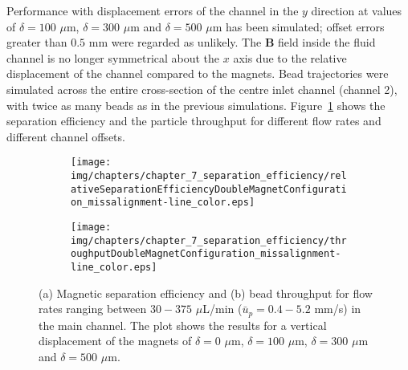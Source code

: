 Performance with displacement errors of the channel in the $y$ direction at values of $\delta=100$ $\mu$m, $\delta=300$ $\mu$m and $\delta=500$ $\mu$m has been simulated; offset errors greater than $0.5$ mm were regarded as unlikely. The $\mathbf{B}$ field inside the fluid channel is no longer symmetrical about the $x$ axis due to the relative displacement of the channel compared to the magnets. Bead trajectories were simulated across the entire cross-section of the centre inlet channel (channel 2), with twice as many beads as in the previous simulations. Figure~\ref{fig:relativeSeparationEfficiencyAndParticleThroughputDoubleMagnetConfigurationMagnetOffset} shows the separation efficiency and the particle throughput for different flow rates and different channel offsets.

\begin{figure}[htb]
        \centering
        \begin{subfigure}[b]{0.48\textwidth}
                \texttt{[image: img/chapters/chapter\_7\_separation\_efficiency/relativeSeparationEfficiencyDoubleMagnetConfiguration\_missalignment-line\_color.eps]}
                \caption{}  
        \end{subfigure}
        \hfill
        \begin{subfigure}[b]{0.48\textwidth}
                \texttt{[image: img/chapters/chapter\_7\_separation\_efficiency/throughputDoubleMagnetConfiguration\_missalignment-line\_color.eps]}
                \caption{}                
        \end{subfigure}
        \caption[Relative magnetic bead separation efficiency and throughput when the microfluidic channel has a displacement compared to the two magnets of the Double Magnet configuration]{(a) Magnetic separation efficiency and (b) bead throughput for flow rates ranging between $30-375$ $\mu$L/min ($\bar{u}_{p}=0.4-5.2$ mm/s) in the main channel. The plot shows the results for a vertical displacement of the magnets of $\delta=0$ $\mu$m, $\delta=100$ $\mu$m, $\delta=300$ $\mu$m and $\delta=500$ $\mu$m.}
        \label{fig:relativeSeparationEfficiencyAndParticleThroughputDoubleMagnetConfigurationMagnetOffset}
\end{figure}


